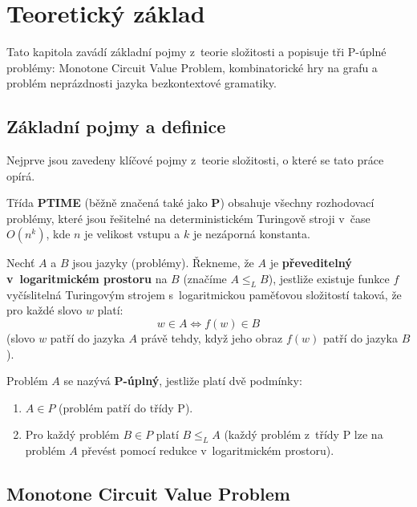 \chapter{Teoretický základ}
\label{sec:Theory}

Tato kapitola zavádí základní pojmy z~teorie složitosti a popisuje tři P-úplné problémy: Monotone Circuit Value Problem, kombinatorické hry na grafu a problém neprázdnosti jazyka bezkontextové gramatiky.

\section{Základní pojmy a definice}
\label{sec:TheoryDefinitions}

Nejprve jsou zavedeny klíčové pojmy z~teorie složitosti, o které se tato práce opírá.

\begin{definition}
Třída \textbf{PTIME} (běžně značená také jako \textbf{P}) obsahuje všechny rozhodovací problémy, které jsou řešitelné na deterministickém Turingově stroji v~čase $O(n^k)$, kde $n$ je velikost vstupu a $k$ je nezáporná konstanta.
\end{definition}

\begin{definition}
Nechť $A$ a $B$ jsou jazyky (problémy). Řekneme, že $A$ je \textbf{převeditelný v~logaritmickém prostoru} na $B$ (značíme $A \leq_L B$), jestliže existuje funkce $f$ vyčíslitelná Turingovým strojem s~logaritmickou paměťovou složitostí taková, že pro každé slovo $w$ platí:
$$ w \in A \iff f(w) \in B $$
(slovo $w$ patří do jazyka $A$ právě tehdy, když jeho obraz $f(w)$ patří do jazyka $B$).
\end{definition}

\begin{definition}
Problém $A$ se nazývá \textbf{P-úplný}, jestliže platí dvě podmínky:
\begin{enumerate}
    \item $A \in P$ (problém patří do třídy P).
    \item Pro každý problém $B \in P$ platí $B \leq_L A$ (každý problém z~třídy P lze na problém $A$ převést pomocí redukce v~logaritmickém prostoru).
\end{enumerate}
\end{definition}

\section{Monotone Circuit Value Problem}
\label{sec:TheoryMCVP}

